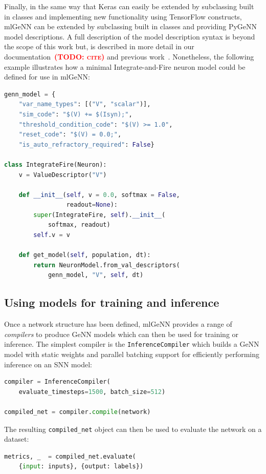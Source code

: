 \documentclass[sigconf]{acmart}
\newcommand{\todo}[1]{\textbf{\textsc{\textcolor{red}{(TODO: #1)}}}}
\begin{document}
Finally, in the same way that Keras can easily be extended by subclassing built in classes and implementing new functionality using TensorFlow constructs, mlGeNN can be extended by subclassing  built in classes and providing PyGeNN model descriptions. 
A full description of the model description syntax is beyond the scope of this work but, is described in more detail in our documentation~\todo{cite} and previous work~\citep{Knight2021}.
Nonetheless, the following example illustrates how a minimal Integrate-and-Fire neuron model could be defined for use in mlGeNN:

\begin{lstlisting}[language=Python]
genn_model = {
    "var_name_types": [("V", "scalar")],
    "sim_code": "$(V) += $(Isyn);",
    "threshold_condition_code": "$(V) >= 1.0",
    "reset_code": "$(V) = 0.0;",
    "is_auto_refractory_required": False}

class IntegrateFire(Neuron):
    v = ValueDescriptor("V")

    def __init__(self, v = 0.0, softmax = False, 
                 readout=None):
        super(IntegrateFire, self).__init__(
            softmax, readout)
        self.v = v

    def get_model(self, population, dt):
        return NeuronModel.from_val_descriptors(
            genn_model, "V", self, dt)
\end{lstlisting}


\subsection{Using models for training and inference}
Once a network structure has been defined, mlGeNN provides a range of \emph{compilers} to produce GeNN models which can then be used for training or inference.
The simplest compiler is the \lstinline{InferenceCompiler} which builds a GeNN model with static weights and parallel batching support for efficiently performing inference on an SNN model:

\begin{lstlisting}[language=Python]
compiler = InferenceCompiler(
    evaluate_timesteps=1500, batch_size=512)

compiled_net = compiler.compile(network)
\end{lstlisting}

The resulting \lstinline{compiled_net} object can then be used to evaluate the network on a dataset:

\begin{lstlisting}[language=Python]
metrics, _  = compiled_net.evaluate(
    {input: inputs}, {output: labels})
\end{lstlisting}
\end{document}
